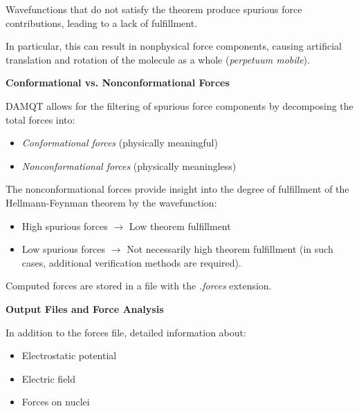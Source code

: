 \documentclass[10pt]{article}
\begin{document}
Wavefunctions that do not satisfy the theorem produce spurious force contributions,
leading to a lack of fulfillment.

In particular, this can result in nonphysical force components,
causing artificial translation and rotation of the molecule as a whole ({\it perpetuum mobile}).


\vspace*{3mm}
{\bf Conformational vs. Nonconformational Forces}
\vspace*{3mm}

DAMQT allows for the filtering of spurious force components
by decomposing the total forces into:

\begin{itemize}
\item {\it Conformational forces} (physically meaningful)
\item {\it Nonconformational forces} (physically meaningless)
\end{itemize}

The nonconformational forces provide insight into the
degree of fulfillment of the Hellmann-Feynman theorem by the wavefunction:

\begin{itemize}
\item High spurious forces $\rightarrow$ Low theorem fulfillment
\item Low spurious forces $\rightarrow$ Not necessarily high theorem fulfillment
(in such cases, additional verification methods are required).
\end{itemize}

Computed forces are stored in a file with the {\it .forces} extension.

\newpage
{\bf Output Files and Force Analysis}
\vspace*{3mm}

In addition to the forces file, detailed information about:

\begin{itemize}
\item Electrostatic potential
\item Electric field
\item Forces on nuclei
\end{itemize}
\end{document}
